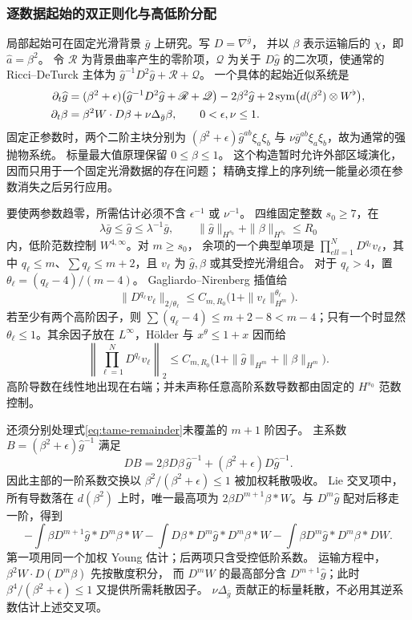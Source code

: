 \documentclass[UTF8,a4paper,11pt,fontset=fandol]{ctexart}
\numberwithin{equation}{section}
\theoremstyle{definition}
\begin{document}
\subsubsection{逐数据起始的双正则化与高低阶分配}\label{sec:tame-start}
局部起始可在固定光滑背景 $\bar g$ 上研究。写 $D=\nabla^{\bar g}$，
并以 $\beta$ 表示运输后的 $\chi$，即 $\widehat a=\beta^2$。
令 $\mathscr R$ 为背景曲率产生的零阶项，$\mathscr Q$ 为关于
$D\widehat g$ 的二次项，使通常的 Ricci--DeTurck 主体为
$\widehat g^{-1}D^2\widehat g+\mathscr R+\mathscr Q$。
一个具体的起始近似系统是
\begin{align}
\partial_t\widehat g
&=(\beta^2+\epsilon)
 \bigl(\widehat g^{-1}D^2\widehat g+\mathscr R+\mathscr Q\bigr)
-2\beta^2\widehat g
+2\operatorname{sym}\bigl(d(\beta^2)\otimes W^\flat\bigr),\notag\\
\partial_t\beta
&=\beta^2W\cdot D\beta+\nu\Delta_{\bar g}\beta,
\qquad 0<\epsilon,\nu\le1.\label{eq:double-regularized-start}
\end{align}
固定正参数时，两个二阶主块分别为
$(\beta^2+\epsilon)\widehat g^{ab}\xi_a\xi_b$ 与
$\nu\bar g^{ab}\xi_a\xi_b$，故为通常的强抛物系统。
标量最大值原理保留 $0\le\beta\le1$。
这个构造暂时允许外部区域演化，因而只用于一个固定光滑数据的存在问题；
精确支撑上的序列统一能量必须在参数消失之后另行应用。

要使两参数趋零，所需估计必须不含 $\epsilon^{-1}$ 或 $\nu^{-1}$。
四维固定整数 $s_0\ge7$，在
\[
\lambda\bar g\le\widehat g\le\lambda^{-1}\bar g,
\qquad \|\widehat g\|_{H^{s_0}}+\|\beta\|_{H^{s_0}}\le R_0
\]
内，低阶范数控制 $W^{4,\infty}$。对 $m\ge s_0$，
余项的一个典型单项是 $\prod_{ell=1}^N D^{q_\ell}v_\ell$，其中
$q_\ell\le m$、$\sum q_\ell\le m+2$，且 $v_\ell$ 为
$\widehat g,\beta$ 或其受控光滑组合。
对于 $q_\ell>4$，置 $\theta_\ell=(q_\ell-4)/(m-4)$。
Gagliardo--Nirenberg 插值给
\[
\|D^{q_\ell}v_\ell\|_{2/\theta_\ell}
\le C_{m,R_0}\bigl(1+\|v_\ell\|_{H^m}^{\theta_\ell}\bigr).
\]
若至少有两个高阶因子，则
$\sum(q_\ell-4)\le m+2-8<m-4$；只有一个时显然
$\theta_\ell\le1$。其余因子放在 $L^\infty$，H\"older 与
$x^\theta\le1+x$ 因而给
\begin{equation}\label{eq:tame-remainder}
\left\|\prod_{\ell=1}^ND^{q_\ell}v_\ell\right\|_2
\le C_{m,R_0}\bigl(1+\|\widehat g\|_{H^m}+\|\beta\|_{H^m}\bigr).
\end{equation}
高阶导数在线性地出现在右端；并未声称任意高阶系数导数都由固定的
$H^{s_0}$ 范数控制。

还须分别处理式\eqref{eq:tame-remainder}未覆盖的 $m+1$ 阶因子。
主系数 $B=(\beta^2+\epsilon)\widehat g^{-1}$ 满足
\[
DB=2\beta D\beta\,\widehat g^{-1}
+(\beta^2+\epsilon)D\widehat g^{-1}.
\]
因此主部的一阶系数交换以
$\beta^2/(\beta^2+\epsilon)\le1$ 被加权耗散吸收。
Lie 交叉项中，所有导数落在 $d(\beta^2)$ 上时，唯一最高项为
$2\beta D^{m+1}\beta*W$。与 $D^m\widehat g$ 配对后移走一阶，得到
\[
-\int\beta D^{m+1}\widehat g*D^m\beta*W
-\int D\beta*D^m\widehat g*D^m\beta*W
-\int\beta D^m\widehat g*D^m\beta*DW.
\]
第一项用同一个加权 Young 估计；后两项只含受控低阶系数。
运输方程中，$\beta^2W\cdot D(D^m\beta)$ 先按散度积分，
而 $D^mW$ 的最高部分含 $D^{m+1}\widehat g$；此时
$\beta^4/(\beta^2+\epsilon)\le1$ 又提供所需耗散因子。
$\nu\Delta_{\bar g}$ 贡献正的标量耗散，不必用其逆系数估计上述交叉项。
\end{document}
